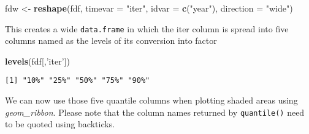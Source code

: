 \documentclass[]{article}
\newenvironment{Shaded}{\begin{snugshade}}{\end{snugshade}}
\newcommand{\KeywordTok}[1]{\textcolor[rgb]{0.13,0.29,0.53}{\textbf{{#1}}}}
\newcommand{\DataTypeTok}[1]{\textcolor[rgb]{0.13,0.29,0.53}{{#1}}}
\newcommand{\DecValTok}[1]{\textcolor[rgb]{0.00,0.00,0.81}{{#1}}}
\newcommand{\StringTok}[1]{\textcolor[rgb]{0.31,0.60,0.02}{{#1}}}
\newcommand{\NormalTok}[1]{{#1}}
\begin{document}
\begin{Shaded}
\begin{Highlighting}[]
\NormalTok{fdw <-}\StringTok{ }\KeywordTok{reshape}\NormalTok{(fdf, }\DataTypeTok{timevar =} \StringTok{"iter"}\NormalTok{, }\DataTypeTok{idvar =} \KeywordTok{c}\NormalTok{(}\StringTok{"year"}\NormalTok{), }\DataTypeTok{direction =} \StringTok{"wide"}\NormalTok{)}
\end{Highlighting}
\end{Shaded}

This creates a wide \texttt{data.frame} in which the iter column is
spread into five columns named as the levels of its conversion into
factor

\begin{Shaded}
\begin{Highlighting}[]
\KeywordTok{levels}\NormalTok{(fdf[,}\StringTok{'iter'}\NormalTok{])}
\end{Highlighting}
\end{Shaded}

\begin{verbatim}
[1] "10%" "25%" "50%" "75%" "90%"
\end{verbatim}

We can now use those five quantile columns when plotting shaded areas
using \emph{geom\_ribbon}. Please note that the column names returned by
\texttt{quantile()} need to be quoted using backticks.

\begin{Shaded}
\end{Shaded}
\end{document}
